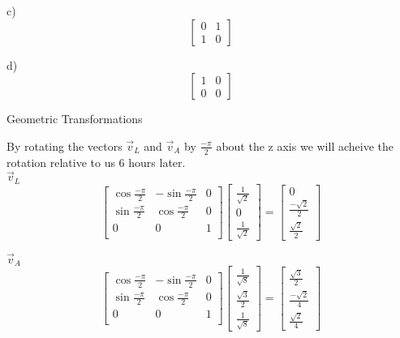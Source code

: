 \documentclass[12pt]{article}
\newcommand{\sqbrl}{\left[}
\newcommand{\sqbrr}{\right]}
\newenvironment{problem}[2][Problem]{\begin{trivlist}
\item[\hskip \labelsep {\bfseries #1}\hskip \labelsep {\bfseries #2.}]}{\end{trivlist}}
\begin{document}
c)\\
	\[\sqbrl\begin{matrix}0 & 1\\1 & 0\end{matrix}\sqbrr\]
	
d)\\
	\[\sqbrl\begin{matrix}1 & 0\\0 & 0\end{matrix}\sqbrr\]

\begin{problem}{6}
	Geometric Transformations
\end{problem}
By rotating the vectors $\vec v_L$ and $\vec v_A$ by $\frac{-\pi}{2}$ about the z axis we will acheive the rotation relative to us 6 hours later.\\

$\vec v_L$
\[\sqbrl\begin{matrix}
\cos{\frac{-\pi}{2}} & -\sin{\frac{-\pi}{2}} & 0\\
\sin{\frac{-\pi}{2}} & \cos{\frac{-\pi}{2}} & 0 \\
0 & 0 & 1\\\end{matrix}\sqbrr
\sqbrl\begin{matrix}\frac{1}{\sqrt2}\\0\\\frac{1}{\sqrt2}\end{matrix}\sqbrr
= \sqbrl\begin{matrix}0\\\frac{-\sqrt{2}}{2}\\\frac{\sqrt{2}}{2}\end{matrix}\sqbrr\]


$\vec v_A$
\[\sqbrl\begin{matrix}
\cos{\frac{-\pi}{2}} & -\sin{\frac{-\pi}{2}} & 0\\
\sin{\frac{-\pi}{2}} & \cos{\frac{-\pi}{2}} & 0 \\
0 & 0 & 1\\\end{matrix}\sqbrr
\sqbrl\begin{matrix}\frac{1}{\sqrt8}\\
\frac{\sqrt{3}}{2}\\
\frac{1}{\sqrt{8}}\end{matrix}\sqbrr
= \sqbrl\begin{matrix}
\frac{\sqrt{3}}{2}\\
\frac{-\sqrt{2}}{4}\\
\frac{\sqrt{2}}{4}\end{matrix}\sqbrr\]
\end{document}
